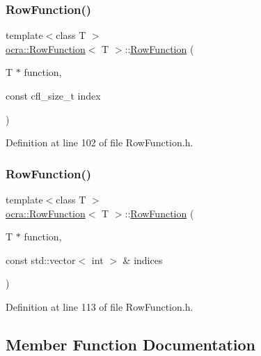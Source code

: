 \subsubsection{\texorpdfstring{Row\+Function()}{RowFunction()}\hspace{0.1cm}{\footnotesize\ttfamily [1/2]}}
{\footnotesize\ttfamily template$<$class T $>$ \\
\hyperlink{classocra_1_1RowFunction}{ocra\+::\+Row\+Function}$<$ T $>$\+::\hyperlink{classocra_1_1RowFunction}{Row\+Function} (\begin{DoxyParamCaption}\item[{T $\ast$}]{function,  }\item[{const cfl\+\_\+size\+\_\+t}]{index }\end{DoxyParamCaption})\hspace{0.3cm}{\ttfamily [inline]}}



Definition at line 102 of file Row\+Function.\+h.

\hypertarget{classocra_1_1RowFunction_a19b2063d4ec61b91fdd8793321414f7d}{}\label{classocra_1_1RowFunction_a19b2063d4ec61b91fdd8793321414f7d} 
\subsubsection{\texorpdfstring{Row\+Function()}{RowFunction()}\hspace{0.1cm}{\footnotesize\ttfamily [2/2]}}
{\footnotesize\ttfamily template$<$class T $>$ \\
\hyperlink{classocra_1_1RowFunction}{ocra\+::\+Row\+Function}$<$ T $>$\+::\hyperlink{classocra_1_1RowFunction}{Row\+Function} (\begin{DoxyParamCaption}\item[{T $\ast$}]{function,  }\item[{const std\+::vector$<$ int $>$ \&}]{indices }\end{DoxyParamCaption})\hspace{0.3cm}{\ttfamily [inline]}}



Definition at line 113 of file Row\+Function.\+h.



\subsection{Member Function Documentation}
\hypertarget{classocra_1_1RowFunction_a3d32e6e76f2f4aed5630e0a59cf08756}{}\label{classocra_1_1RowFunction_a3d32e6e76f2f4aed5630e0a59cf08756} 

